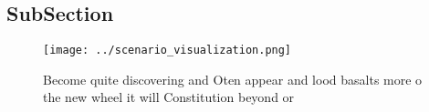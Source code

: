 \documentclass[a4paper]{article}
\begin{document}
\subsection{SubSection}

\begin{figure}
\centering
\texttt{[image: ../scenario\_visualization.png]}
\caption{Become quite discovering and Oten appear and lood basalts more o the new wheel it will Constitution beyond or
}
\end{figure}
 
\end{document}
